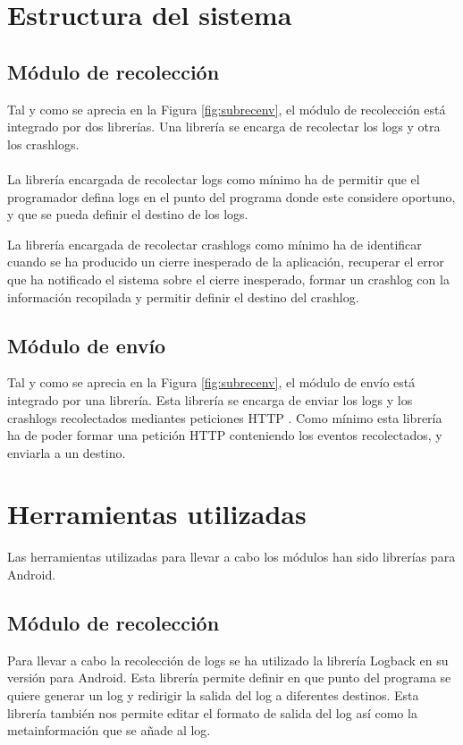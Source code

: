 \section{Estructura del sistema}

\subsection{Módulo de recolección}
Tal y como se aprecia en la Figura \ref{fig:subrecenv}, el módulo de recolección está integrado por dos librerías. Una librería se encarga de recolectar los logs y otra los crashlogs.
\\\\
La librería encargada de recolectar logs como mínimo ha de permitir que el programador defina logs en el punto del programa donde este considere oportuno, y que se pueda definir el destino de los logs.

La librería encargada de recolectar crashlogs como mínimo ha de identificar cuando se ha producido un cierre inesperado de la aplicación, recuperar el error que ha notificado el sistema sobre el cierre inesperado, formar un crashlog con la información recopilada y permitir definir el destino del crashlog.

\subsection{Módulo de envío}
Tal y como se aprecia en la Figura \ref{fig:subrecenv}, el módulo de envío está integrado por una librería. Esta librería se encarga de enviar los logs y los crashlogs recolectados mediantes peticiones HTTP \cite{Tfg:HTTPv1-1}. Como mínimo esta librería ha de poder formar una petición HTTP conteniendo los eventos recolectados, y enviarla a un destino.

\section{Herramientas utilizadas}

Las herramientas utilizadas para llevar a cabo los módulos han sido librerías para Android.

\subsection{Módulo de recolección}
Para llevar a cabo la recolección de logs se ha utilizado la librería Logback\cite{Tfg:logbackandroid} en su versión para Android. Esta librería permite definir en que punto del programa se quiere generar un log y redirigir la salida del log a diferentes destinos. Esta librería también nos permite editar el formato de salida del log así como la metainformación que se añade al log.

